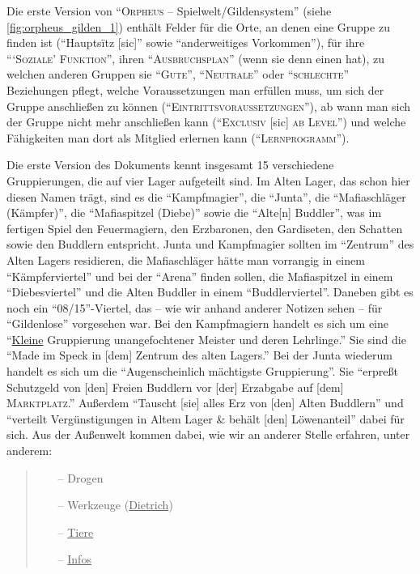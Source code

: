 \documentclass[a5paper,pagesize,numbers=noenddot]{scrbook}
\begin{document}
Die erste Version von \enquote{\textsc{Orpheus} -- Spielwelt/Gildensystem} (siehe \autoref{fig:orpheus_gilden_1}) enthält Felder für die Orte, an denen eine Gruppe zu finden ist (\enquote{Hauptsïtz [sic]} sowie \enquote{anderweitiges Vorkommen}), für ihre \enquote{\enquote{\textsc{Soziale}} \textsc{Funktion}}, ihren \enquote{\textsc{Ausbruchsplan}} (wenn sie denn einen hat), zu welchen anderen Gruppen sie \enquote{\textsc{Gute}}, \enquote{\textsc{Neutrale}} oder \enquote{\textsc{schlechte}} Beziehungen pflegt, welche Voraussetzungen man erfüllen muss, um sich der Gruppe anschließen zu können (\enquote{\textsc{Eintrittsvoraussetzungen}}), ab wann man sich der Gruppe nicht mehr anschließen kann (\enquote{\textsc{Exclusiv} [sic] \textsc{ab Level}}) und welche Fähigkeiten man dort als Mitglied erlernen kann (\enquote{\textsc{Lernprogramm}}).

Die erste Version des Dokuments kennt insgesamt 15 verschiedene Gruppierungen, die auf vier Lager aufgeteilt sind.
Im Alten Lager, das schon hier diesen Namen trägt, sind es die \enquote{Kampfmagier}, die \enquote{Junta}, die \enquote{Mafiaschläger (Kämpfer)}, die \enquote{Mafiaspitzel (Diebe)} sowie die \enquote{Alte[n] Buddler}, was im fertigen Spiel den Feuermagiern, den Erzbaronen, den Gardiseten, den Schatten sowie den Buddlern entspricht.
Junta und Kampfmagier sollten im \enquote{Zentrum} des Alten Lagers residieren, die Mafiaschläger hätte man vorrangig in einem \enquote{Kämpferviertel} und bei der \enquote{Arena} finden sollen, die Mafiaspitzel in einem \enquote{Diebesviertel} und die Alten Buddler in einem \enquote{Buddlerviertel}.
Daneben gibt es noch ein \enquote{08/15}-Viertel, das -- wie wir anhand anderer Notizen sehen -- für \enquote{Gildenlose}\autocite[S.~15]{orpheus_b_scribbles} vorgesehen war.
Bei den Kampfmagiern handelt es sich um eine \enquote{\uline{Kleine} Gruppierung unangefochtener Meister und deren Lehrlinge.} Sie sind die \enquote{Made im Speck in [dem] Zentrum des alten Lagers.}
Bei der Junta wiederum handelt es sich um die \enquote{Augenscheinlich mächtigste Gruppierung}.
Sie \enquote{erpreßt Schutzgeld von [den] Freien Buddlern vor [der] Erzabgabe auf [dem] \textsc{Marktplatz}.}
Außerdem \enquote{Tauscht [sie] alles Erz von [den] Alten Buddlern} und \enquote{verteilt Vergünstigungen in Altem Lager \& behält [den] Löwenanteil} dabei für sich.
Aus der Außenwelt kommen dabei, wie wir an anderer Stelle erfahren, unter anderem:

\begin{quote}
   \begin{itemize}
      \item[--] Drogen
      \item[--] Werkzeuge (\uline{Dietrich})
      \item[--] \uline{Tiere}
      \item[--] \uline{Infos}\autocite[S.~6]{orpheus_b_scribbles}
   \end{itemize}
\end{quote}
\end{document}
